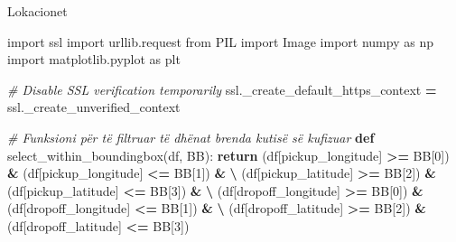\documentclass[
  ignorenonframetext,
]{beamer}
\newenvironment{Shaded}{\begin{snugshade}}{\end{snugshade}}
\newcommand{\CommentTok}[1]{\textcolor[rgb]{0.56,0.35,0.01}{\textit{#1}}}
\newcommand{\ControlFlowTok}[1]{\textcolor[rgb]{0.13,0.29,0.53}{\textbf{#1}}}
\newcommand{\DecValTok}[1]{\textcolor[rgb]{0.00,0.00,0.81}{#1}}
\newcommand{\ImportTok}[1]{#1}
\newcommand{\KeywordTok}[1]{\textcolor[rgb]{0.13,0.29,0.53}{\textbf{#1}}}
\newcommand{\NormalTok}[1]{#1}
\newcommand{\OperatorTok}[1]{\textcolor[rgb]{0.81,0.36,0.00}{\textbf{#1}}}
\newcommand{\StringTok}[1]{\textcolor[rgb]{0.31,0.60,0.02}{#1}}
\begin{document}
\begin{frame}[fragile]{Lokacionet}
\protect\hypertarget{lokacionet-5}{}

\begin{Shaded}
\begin{Highlighting}[]
\ImportTok{import}\NormalTok{ ssl}
\ImportTok{import}\NormalTok{ urllib.request}
\ImportTok{from}\NormalTok{ PIL }\ImportTok{import}\NormalTok{ Image}
\ImportTok{import}\NormalTok{ numpy }\ImportTok{as}\NormalTok{ np}
\ImportTok{import}\NormalTok{ matplotlib.pyplot }\ImportTok{as}\NormalTok{ plt}

\CommentTok{\# Disable SSL verification temporarily}
\NormalTok{ssl.\_create\_default\_https\_context }\OperatorTok{=}\NormalTok{ ssl.\_create\_unverified\_context}

\CommentTok{\# Funksioni për të filtruar të dhënat brenda kutisë së kufizuar}
\KeywordTok{def}\NormalTok{ select\_within\_boundingbox(df, BB):}
    \ControlFlowTok{return}\NormalTok{ (df[}\StringTok{\textquotesingle{}pickup\_longitude\textquotesingle{}}\NormalTok{] }\OperatorTok{\textgreater{}=}\NormalTok{ BB[}\DecValTok{0}\NormalTok{]) }\OperatorTok{\&}\NormalTok{ (df[}\StringTok{\textquotesingle{}pickup\_longitude\textquotesingle{}}\NormalTok{] }\OperatorTok{\textless{}=}\NormalTok{ BB[}\DecValTok{1}\NormalTok{]) }\OperatorTok{\&} \OperatorTok{\textbackslash{}}
\NormalTok{           (df[}\StringTok{\textquotesingle{}pickup\_latitude\textquotesingle{}}\NormalTok{] }\OperatorTok{\textgreater{}=}\NormalTok{ BB[}\DecValTok{2}\NormalTok{]) }\OperatorTok{\&}\NormalTok{ (df[}\StringTok{\textquotesingle{}pickup\_latitude\textquotesingle{}}\NormalTok{] }\OperatorTok{\textless{}=}\NormalTok{ BB[}\DecValTok{3}\NormalTok{]) }\OperatorTok{\&} \OperatorTok{\textbackslash{}}
\NormalTok{           (df[}\StringTok{\textquotesingle{}dropoff\_longitude\textquotesingle{}}\NormalTok{] }\OperatorTok{\textgreater{}=}\NormalTok{ BB[}\DecValTok{0}\NormalTok{]) }\OperatorTok{\&}\NormalTok{ (df[}\StringTok{\textquotesingle{}dropoff\_longitude\textquotesingle{}}\NormalTok{] }\OperatorTok{\textless{}=}\NormalTok{ BB[}\DecValTok{1}\NormalTok{]) }\OperatorTok{\&} \OperatorTok{\textbackslash{}}
\NormalTok{           (df[}\StringTok{\textquotesingle{}dropoff\_latitude\textquotesingle{}}\NormalTok{] }\OperatorTok{\textgreater{}=}\NormalTok{ BB[}\DecValTok{2}\NormalTok{]) }\OperatorTok{\&}\NormalTok{ (df[}\StringTok{\textquotesingle{}dropoff\_latitude\textquotesingle{}}\NormalTok{] }\OperatorTok{\textless{}=}\NormalTok{ BB[}\DecValTok{3}\NormalTok{])}


\end{Highlighting}
\end{Shaded}
\end{frame}
\end{document}
